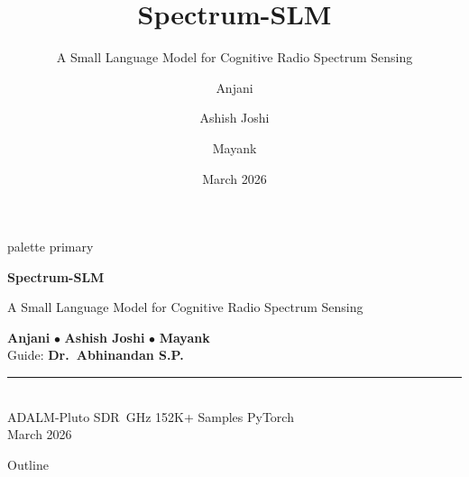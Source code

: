 \documentclass[aspectratio=169, 10pt]{beamer}
\title[Spectrum-SLM]{\textbf{Spectrum-SLM}}
\subtitle{A Small Language Model for Cognitive Radio Spectrum Sensing}
\author[Anjani et al.]{Anjani \and Ashish Joshi \and Mayank}
\institute[]{Guide: \textbf{Dr.\ Abhinandan S.P.}}
\date{March 2026}
\begin{document}

{
\begin{frame}[plain]
\vfill
\begin{beamercolorbox}[sep=10pt,center,rounded=true]{palette primary}
  {\LARGE\bfseries Spectrum-SLM\par}
  \vskip4pt
  {\small A Small Language Model for Cognitive Radio Spectrum Sensing\par}
\end{beamercolorbox}
\vskip12pt
\begin{center}
  {\normalsize \textbf{Anjani} \;\;$\bullet$\;\; \textbf{Ashish Joshi} \;\;$\bullet$\;\; \textbf{Mayank}}\\[6pt]
  {\small Guide: \textbf{Dr.\ Abhinandan S.P.}}\\[10pt]
  \textcolor{royalblue}{\rule{5cm}{0.8pt}}\\[6pt]
  {\scriptsize ADALM-Pluto SDR \;\textbar{}\,GHz \;\textbar\; 152K+ Samples \;\textbar\; PyTorch}\\[4pt]
  {\footnotesize March 2026}
\end{center}
\vfill
\end{frame}
}

\begin{frame}{Outline}
\small
\tableofcontents
\end{frame}


\end{document}
